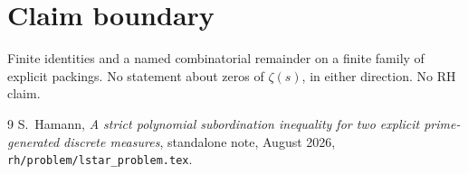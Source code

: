 \documentclass[11pt]{article}
\theoremstyle{remark}
\begin{document}
\section*{Claim boundary}

Finite identities and a named combinatorial remainder on a finite
family of explicit packings.  No statement about zeros of
$\zeta(s)$, in either direction.  No RH claim.

\begin{thebibliography}{9}
S.~Hamann,
\textit{A strict polynomial subordination inequality for two
explicit prime-generated discrete measures},
standalone note, August 2026,
\texttt{rh/problem/lstar\_problem.tex}.
\end{thebibliography}
\end{document}
